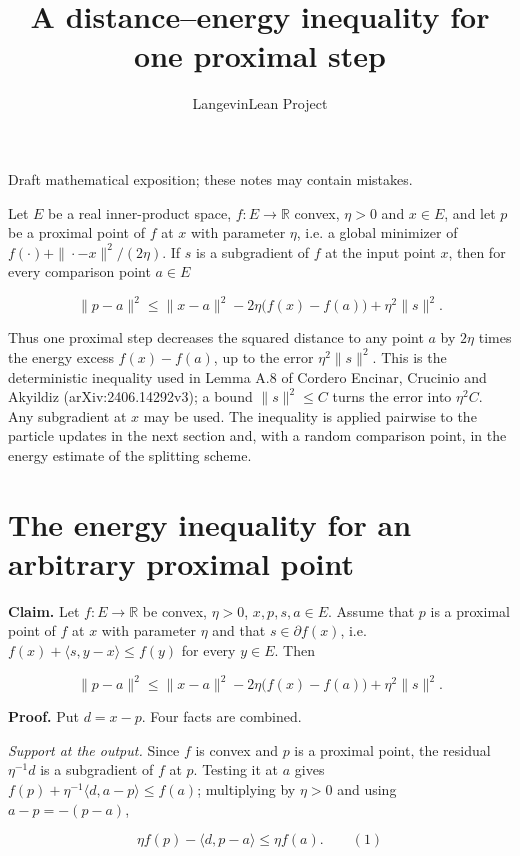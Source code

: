 \documentclass[11pt,a4paper]{article}
\title{\texorpdfstring{A distance–energy inequality for one proximal step}{A distance–energy inequality for one proximal step}}
\author{LangevinLean Project}
\date{}
\begin{document}
\maketitle
Draft mathematical exposition; these notes may contain mistakes.


Let \(E\) be a real inner-product space, \(f:E\to\mathbb R\) convex, \(\eta>0\) and \(x\in E\), and let \(p\) be a proximal point of \(f\) at \(x\) with parameter \(\eta\), i.e. a global minimizer of \(f(\cdot)+\|\cdot-x\|^2/(2\eta)\). If \(s\) is a subgradient of \(f\) at the input point \(x\), then for every comparison point \(a\in E\)


\[\|p-a\|^2\le\|x-a\|^2-2\eta\bigl(f(x)-f(a)\bigr)+\eta^2\|s\|^2.\]


Thus one proximal step decreases the squared distance to any point \(a\) by \(2\eta\) times the energy excess \(f(x)-f(a)\), up to the error \(\eta^2\|s\|^2\). This is the deterministic inequality used in Lemma A.8 of Cordero Encinar, Crucinio and Akyildiz (arXiv:2406.14292v3); a bound \(\|s\|^2\le C\) turns the error into \(\eta^2C\). Any subgradient at \(x\) may be used. The inequality is applied pairwise to the particle updates in the next section and, with a random comparison point, in the energy estimate of the splitting scheme.


\section{\texorpdfstring{The energy inequality for an arbitrary proximal point}{The energy inequality for an arbitrary proximal point}}


\textbf{Claim.} Let \(f:E\to\mathbb R\) be convex, \(\eta>0\), \(x,p,s,a\in E\). Assume that \(p\) is a proximal point of \(f\) at \(x\) with parameter \(\eta\) and that \(s\in\partial f(x)\), i.e. \(f(x)+\langle s,y-x\rangle\le f(y)\) for every \(y\in E\). Then


\[\|p-a\|^2\le\|x-a\|^2-2\eta\bigl(f(x)-f(a)\bigr)+\eta^2\|s\|^2.\]


\textbf{Proof.} Put \(d=x-p\). Four facts are combined.




\emph{Support at the output.} Since \(f\) is convex and \(p\) is a proximal point, the residual \(\eta^{-1}d\) is a subgradient of \(f\) at \(p\). Testing it at \(a\) gives \(f(p)+\eta^{-1}\langle d,a-p\rangle\le f(a)\); multiplying by \(\eta>0\) and using \(a-p=-(p-a)\),


\[\eta f(p)-\langle d,p-a\rangle\le\eta f(a).\qquad(1)\]
\end{document}

